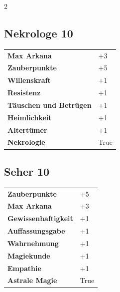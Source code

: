 \begin{multicols}{2}
\begin{tcolorbox}

\end{tcolorbox}

\begin{tcolorbox}
    \subsection*{Nekrologe \hfill \small{10 }}
    \tcblower




\begin{tabular}{@{}ll@{}}
    \textbf{Max Arkana} & +3\\
    \textbf{Zauberpunkte} & +5\\
    \textbf{Willenskraft} & +1\\
    \textbf{Resistenz} & +1\\
    \textbf{Täuschen und Betrügen} & +1\\
    \textbf{Heimlichkeit} & +1\\
    \textbf{Altertümer} & +1\\
    \textbf{Nekrologie} & True\\
\end{tabular}


\end{tcolorbox}

\begin{tcolorbox}
    \subsection*{Seher \hfill \small{10 }}
    \tcblower




\begin{tabular}{@{}ll@{}}
    \textbf{Zauberpunkte} & +5\\
    \textbf{Max Arkana} & +3\\
    \textbf{Gewissenhaftigkeit} & +1\\
    \textbf{Auffassungsgabe} & +1\\
    \textbf{Wahrnehmung} & +1\\
    \textbf{Magiekunde} & +1\\
    \textbf{Empathie} & +1\\
    \textbf{Astrale Magie} & True\\
\end{tabular}


\end{tcolorbox}
\end{multicols}
